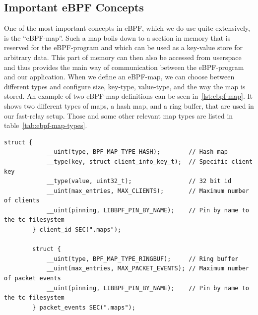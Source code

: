 \subsection{Important eBPF Concepts}
One of the most important concepts in eBPF, which we do use quite extensively, is 
the ``eBPF-map''.
Such a map boils down to a section in memory that is reserved for the eBPF-program
and which can be used as a key-value store for arbitrary data.
This part of memory can then also be accessed from userspace and thus provides the main 
way of communication between the eBPF-program and our application.
When we define an eBPF-map, we can choose between different types and configure
size, key-type, value-type, and the way the map is stored. %
An example of two eBPF-map definitions can be seen in~\autoref{lst:ebpf-map}.
It shows two different types of maps, a hash map, and a ring buffer, that are used in
our fast-relay setup.
Those and some other relevant map types are listed in table~\autoref{tab:ebpf-map-types}.

\vspace{0.5cm}
    \begin{lstlisting}[style=CStyle,caption={Examplary eBPF map definitions.}, label={lst:ebpf-map}]
        struct {
            __uint(type, BPF_MAP_TYPE_HASH);        // Hash map
            __type(key, struct client_info_key_t);  // Specific client key
            __type(value, uint32_t);                // 32 bit id
            __uint(max_entries, MAX_CLIENTS);       // Maximum number of clients
            __uint(pinning, LIBBPF_PIN_BY_NAME);    // Pin by name to the tc filesystem
        } client_id SEC(".maps");

        struct {
            __uint(type, BPF_MAP_TYPE_RINGBUF);     // Ring buffer
            __uint(max_entries, MAX_PACKET_EVENTS); // Maximum number of packet events
            __uint(pinning, LIBBPF_PIN_BY_NAME);    // Pin by name to the tc filesystem
        } packet_events SEC(".maps");
    \end{lstlisting}

\FloatBarrier

